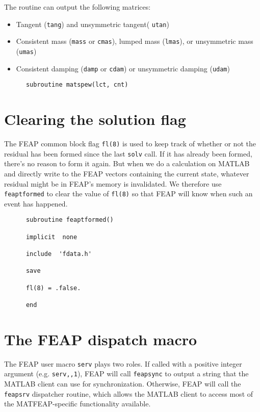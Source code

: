 The routine can output the following matrices:
\begin{itemize}
\item Tangent ({\tt tang}) and unsymmetric tangent( {\tt utan})
\item Consistent mass ({\tt mass} or {\tt cmas}), lumped mass
({\tt lmas}), or unsymmetric mass ({\tt umas})
\item Consistent damping ({\tt damp} or {\tt cdam})
or unsymmetric damping ({\tt udam})
\end{itemize}

\begin{verbatim}
      subroutine matspew(lct, cnt)
\end{verbatim}
\section{Clearing the solution flag}

The FEAP common block flag {\tt fl(8)} is used to keep track of
whether or not the residual has been formed since the last {\tt solv}
call.  If it has already been formed, there's no reason to form it
again.  But when we do a calculation on MATLAB and directly write
to the FEAP vectors containing the current state, whatever residual
might be in FEAP's memory is invalidated.  We therefore use 
{\tt feaptformed} to clear the value of {\tt fl(8)} so that FEAP
will know when such an event has happened.

\begin{verbatim}
      subroutine feaptformed()

      implicit  none

      include  'fdata.h'

      save

      fl(8) = .false.

      end
\end{verbatim}
\section{The FEAP dispatch macro}

The FEAP user macro {\tt serv} plays two roles.  If called with
a positive integer argument (e.g. {\tt serv,,1}), FEAP will call
{\tt feapsync} to output a string that the MATLAB client can
use for synchronization.  Otherwise, FEAP will call the {\tt feapsrv}
dispatcher routine, which allows the MATLAB client to access most of
the MATFEAP-specific functionality available.

